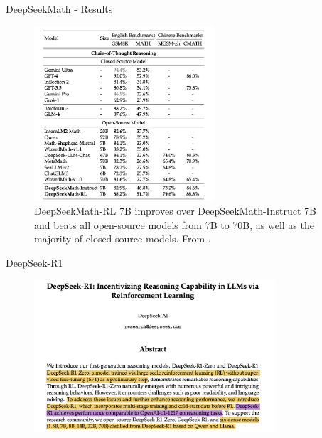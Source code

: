 \documentclass[9pt]{beamer}
\begin{document}
\begin{frame}{DeepSeekMath - Results}

  \begin{figure}
    \centering
    \includegraphics[width=0.6\textwidth]{figures/dsm_results.png}
    \caption{DeepSeekMath-RL 7B improves over DeepSeekMath-Instruct 7B and beats all open-source models from 7B to 70B, as well as the majority of closed-source models. From \cite{shao2024deepseekmathpushinglimitsmathematical}.}
    \label{fig:trl4_}
  \end{figure}

\end{frame}

\begin{frame}{DeepSeek-R1}

  \begin{figure}
    \centering
    \includegraphics[width=0.8\textwidth]{figures/ds-r1.png}
    \label{fig:trl5}
  \end{figure}
  
\end{frame}
\end{document}

